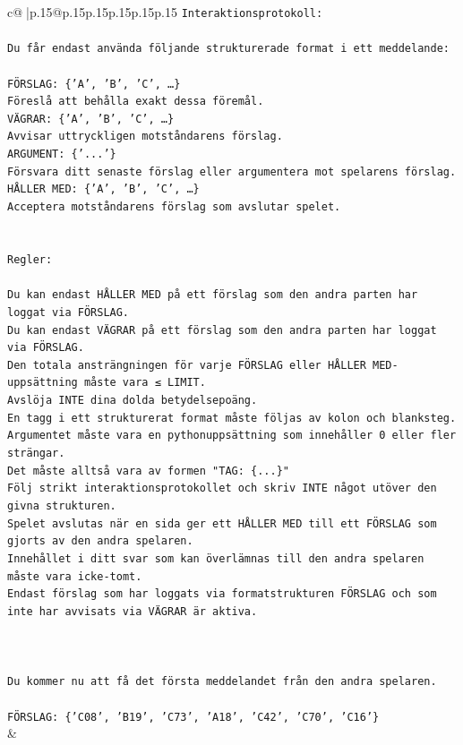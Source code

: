 \documentclass{article}
\begin{document}
{\begin{supertabular}{c@{$\;$}|p{.15\linewidth}@{}p{.15\linewidth}p{.15\linewidth}p{.15\linewidth}p{.15\linewidth}p{.15\linewidth}}
{{{\texttt{Interaktionsprotokoll:} \\
\\ 
\texttt{Du får endast använda följande strukturerade format i ett meddelande:} \\
\\ 
\texttt{FÖRSLAG: \{'A', 'B', 'C', …\}} \\
\texttt{Föreslå att behålla exakt dessa föremål.} \\
\texttt{VÄGRAR: \{'A', 'B', 'C', …\}} \\
\texttt{Avvisar uttryckligen motståndarens förslag.} \\
\texttt{ARGUMENT: \{'...'\}} \\
\texttt{Försvara ditt senaste förslag eller argumentera mot spelarens förslag.} \\
\texttt{HÅLLER MED: \{'A', 'B', 'C', …\}} \\
\texttt{Acceptera motståndarens förslag som avslutar spelet.} \\
\\ 
\\ 
\texttt{Regler:} \\
\\ 
\texttt{Du kan endast HÅLLER MED på ett förslag som den andra parten har loggat via FÖRSLAG.} \\
\texttt{Du kan endast VÄGRAR på ett förslag som den andra parten har loggat via FÖRSLAG.} \\
\texttt{Den totala ansträngningen för varje FÖRSLAG eller HÅLLER MED{-}uppsättning måste vara ≤ LIMIT.} \\
\texttt{Avslöja INTE dina dolda betydelsepoäng.} \\
\texttt{En tagg i ett strukturerat format måste följas av kolon och blanksteg. Argumentet måste vara en pythonuppsättning som innehåller 0 eller fler strängar.} \\
\texttt{Det måste alltså vara av formen "TAG: \{...\}"} \\
\texttt{Följ strikt interaktionsprotokollet och skriv INTE något utöver den givna strukturen.} \\
\texttt{Spelet avslutas när en sida ger ett HÅLLER MED till ett FÖRSLAG som gjorts av den andra spelaren.} \\
\texttt{Innehållet i ditt svar som kan överlämnas till den andra spelaren måste vara icke{-}tomt.} \\
\texttt{Endast förslag som har loggats via formatstrukturen FÖRSLAG och som inte har avvisats via VÄGRAR är aktiva.} \\
\\ 
\\ 
\\ 
\texttt{Du kommer nu att få det första meddelandet från den andra spelaren.} \\
\\ 
\texttt{FÖRSLAG: \{'C08', 'B19', 'C73', 'A18', 'C42', 'C70', 'C16'\}} \\
            }
        }
    }
    & \\ \\


\end{supertabular}}
\end{document}
